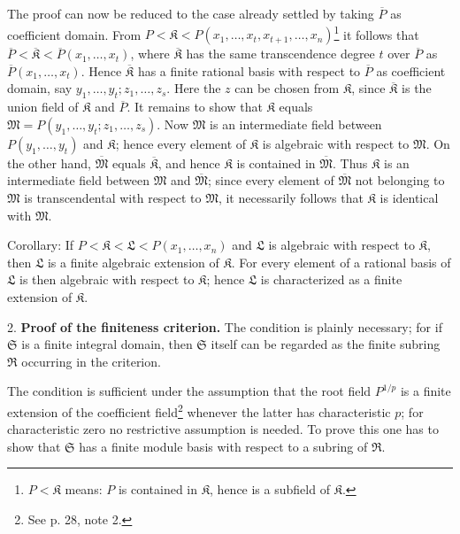 The proof can now be reduced to the case already settled by taking $\overline P$ as coefficient domain. From $P<\mathfrak K<P(x_1,\ldots,x_t,x_{t+1},\ldots,x_n)$\footnote{$P<\mathfrak K$ means: $P$ is contained in $\mathfrak K$, hence is a subfield of $\mathfrak K$.} it follows that $\overline P<\overline{\mathfrak K}<\overline P(x_1,\ldots,x_t)$, where $\overline{\mathfrak K}$ has the same transcendence degree $t$ over $\overline P$ as $\overline P(x_1,\ldots,x_t)$. Hence $\overline{\mathfrak K}$ has a finite rational basis with respect to $\overline P$ as coefficient domain, say $y_1,\ldots,y_t; z_1,\ldots,z_s$. Here the $z$ can be chosen from $\mathfrak K$, since $\overline{\mathfrak K}$ is the union field of $\mathfrak K$ and $\overline P$. It remains to show that $\mathfrak K$ equals $\mathfrak M=P(y_1,\ldots,y_t;z_1,\ldots,z_s)$. Now $\mathfrak M$ is an intermediate field between $P(y_1,\ldots,y_t)$ and $\mathfrak K$; hence every element of $\mathfrak K$ is algebraic with respect to $\mathfrak M$. On the other hand, $\overline{\mathfrak M}$ equals $\overline{\mathfrak K}$, and hence $\mathfrak K$ is contained in $\overline{\mathfrak M}$. Thus $\mathfrak K$ is an intermediate field between $\mathfrak M$ and $\overline{\mathfrak M}$; since every element of $\overline{\mathfrak M}$ not belonging to $\mathfrak M$ is transcendental with respect to $\mathfrak M$, it necessarily follows that $\mathfrak K$ is identical with $\mathfrak M$.

Corollary: If $P<\mathfrak K<\mathfrak L<P(x_1,\ldots,x_n)$ and $\mathfrak L$ is algebraic with respect to $\mathfrak K$, then $\mathfrak L$ is a finite algebraic extension of $\mathfrak K$. For every element of a rational basis of $\mathfrak L$ is then algebraic with respect to $\mathfrak K$; hence $\mathfrak L$ is characterized as a finite extension of $\mathfrak K$.

2. \textbf{Proof of the finiteness criterion.} The condition is plainly necessary; for if $\mathfrak S$ is a finite integral domain, then $\mathfrak S$ itself can be regarded as the finite subring $\mathfrak R$ occurring in the criterion.

The condition is sufficient under the assumption that the root field $P^{1/p}$ is a finite extension of the coefficient field\footnote{See p. 28, note 2.} whenever the latter has characteristic $p$; for characteristic zero no restrictive assumption is needed. To prove this one has to show that $\mathfrak S$ has a finite module basis with respect to a subring of $\mathfrak R$.

